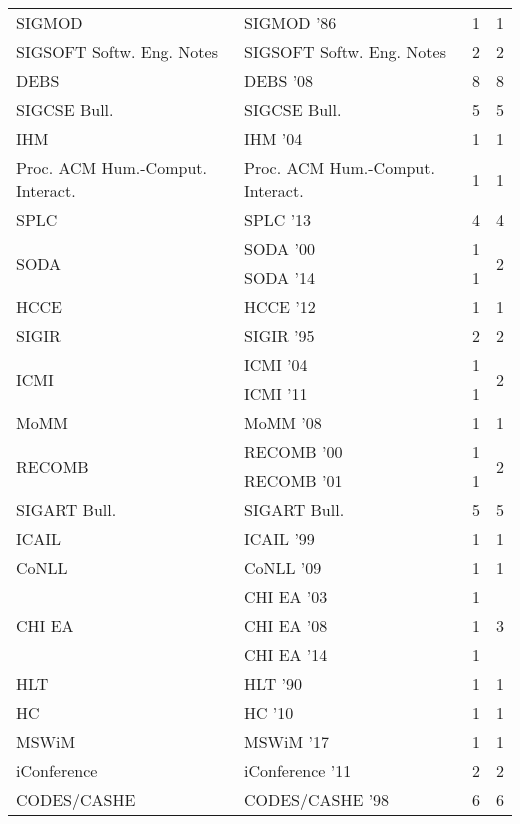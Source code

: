 \begin{table*}[t]
\begin{tabular}{llrr}
\multirow{1}{*}{SIGMOD } & SIGMOD '86 & 1 & \multirow{1}{*}{1}\\
\multirow{1}{*}{SIGSOFT Softw. Eng. Notes} & SIGSOFT Softw. Eng. Notes & 2 & \multirow{1}{*}{2}\\
\multirow{1}{*}{DEBS } & DEBS '08 & 8 & \multirow{1}{*}{8}\\
\multirow{1}{*}{SIGCSE Bull.} & SIGCSE Bull. & 5 & \multirow{1}{*}{5}\\
\multirow{1}{*}{IHM } & IHM '04 & 1 & \multirow{1}{*}{1}\\
\multirow{1}{*}{Proc. ACM Hum.-Comput. Interact.} & Proc. ACM Hum.-Comput. Interact. & 1 & \multirow{1}{*}{1}\\
\multirow{1}{*}{SPLC } & SPLC '13 & 4 & \multirow{1}{*}{4}\\
\multirow{2}{*}{SODA } & SODA '00 & 1 & \multirow{2}{*}{2}\\
& SODA '14 & 1 &\\
\multirow{1}{*}{HCCE } & HCCE '12 & 1 & \multirow{1}{*}{1}\\
\multirow{1}{*}{SIGIR } & SIGIR '95 & 2 & \multirow{1}{*}{2}\\
\multirow{2}{*}{ICMI } & ICMI '04 & 1 & \multirow{2}{*}{2}\\
& ICMI '11 & 1 &\\
\multirow{1}{*}{MoMM } & MoMM '08 & 1 & \multirow{1}{*}{1}\\
\multirow{2}{*}{RECOMB } & RECOMB '00 & 1 & \multirow{2}{*}{2}\\
& RECOMB '01 & 1 &\\
\multirow{1}{*}{SIGART Bull.} & SIGART Bull. & 5 & \multirow{1}{*}{5}\\
\multirow{1}{*}{ICAIL } & ICAIL '99 & 1 & \multirow{1}{*}{1}\\
\multirow{1}{*}{CoNLL } & CoNLL '09 & 1 & \multirow{1}{*}{1}\\
\multirow{3}{*}{CHI EA } & CHI EA '03 & 1 & \multirow{3}{*}{3}\\
& CHI EA '08 & 1 &\\
& CHI EA '14 & 1 &\\
\multirow{1}{*}{HLT } & HLT '90 & 1 & \multirow{1}{*}{1}\\
\multirow{1}{*}{HC } & HC '10 & 1 & \multirow{1}{*}{1}\\
\multirow{1}{*}{MSWiM } & MSWiM '17 & 1 & \multirow{1}{*}{1}\\
\multirow{1}{*}{iConference } & iConference '11 & 2 & \multirow{1}{*}{2}\\
\multirow{1}{*}{CODES/CASHE } & CODES/CASHE '98 & 6 & \multirow{1}{*}{6}\\

\end{tabular}
\end{table*}
